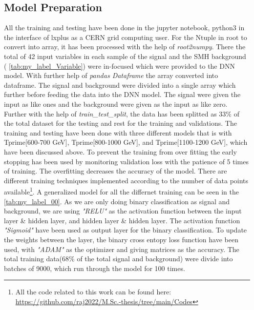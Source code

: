\subsection{Model Preparation}
All the training and testing have been done in the jupyter notebook\cite{Kluyver2016jupyter}, python3 in the interface of lxplus as a CERN grid computing user. For the Ntuple in root to convert into array, it has been processed with the help of \textit{root2numpy}\cite{ml_4}. There the total of 42 input variables in each sample of the signal and the SMH background ( \autoref{tab:my_label_Variable}) were in-focused which were provided to the DNN model. With further help of \textit{pandas Dataframe} \cite{reback2020pandas} the array converted into dataframe. The signal and background were divided into a single array which further before feeding the data into the DNN model. The signal were given the input as like ones and the background were given as the input as like zero. Further with the help of \textit{train\_test\_split}\cite{scikit-learn}, the data has been splitted as 33\% of the total dataset for the testing and rest for the training and validations. The training and testing have been done with three different models that is with Tprime[600-700 GeV], Tprime[800-1000 GeV], and Tprime[1100-1200 GeV], which have been discussed above. To prevent the training from over fitting the early stopping has been used by monitoring validation loss with the patience of 5 times of training. The overfitting decreases the accuracy of the model. There are different training techniques implemented according to the number of data points available\footnote{All the code related to this work can be found here: \url{https://github.com/raj2022/M.Sc.-thesis/tree/main/Codes}}. A generalized model for all the differnet training can be seen in the \autoref{tab:my_label_00}. As we are only doing binary classification as signal and background, we are using \textit{"RELU"} as the activation function between the input layer \& hidden layer, and hidden layer \& hidden layer. The activation function \textit{"Sigmoid"} have been used as output layer for the binary classification. To update the weights between the layer, the binary cross entopy loss function have been used, with \textit{"ADAM"} as the optimizer and giving matrices as the accuracy. The total training data(68\% of the total signal and background) were divide into batches of 9000, which run through the model for 100 times. 

